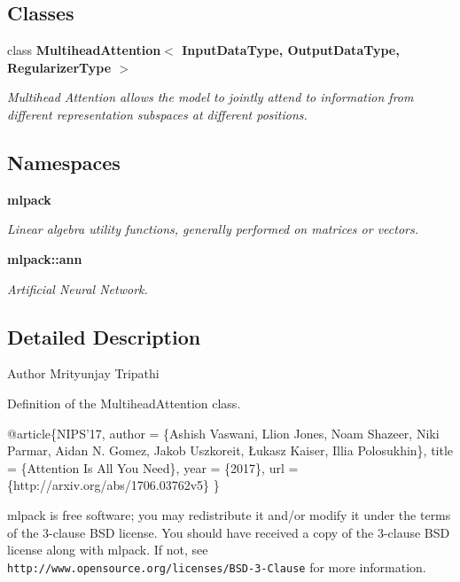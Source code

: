 \subsection*{Classes}
\begin{DoxyCompactItemize}
\item 
class \textbf{ Multihead\+Attention$<$ Input\+Data\+Type, Output\+Data\+Type, Regularizer\+Type $>$}
\begin{DoxyCompactList}\small\item\em Multihead Attention allows the model to jointly attend to information from different representation subspaces at different positions. \end{DoxyCompactList}\end{DoxyCompactItemize}
\subsection*{Namespaces}
\begin{DoxyCompactItemize}
\item 
 \textbf{ mlpack}
\begin{DoxyCompactList}\small\item\em Linear algebra utility functions, generally performed on matrices or vectors. \end{DoxyCompactList}\item 
 \textbf{ mlpack\+::ann}
\begin{DoxyCompactList}\small\item\em Artificial Neural Network. \end{DoxyCompactList}\end{DoxyCompactItemize}


\subsection{Detailed Description}
\begin{DoxyAuthor}{Author}
Mrityunjay Tripathi
\end{DoxyAuthor}
Definition of the Multihead\+Attention class.


\begin{DoxyCode}
@article\{NIPS\textcolor{stringliteral}{'17,}
\textcolor{stringliteral}{  author  = \{Ashish Vaswani, Llion Jones, Noam Shazeer, Niki Parmar,}
\textcolor{stringliteral}{             Aidan N. Gomez, Jakob Uszkoreit, Łukasz Kaiser,}
\textcolor{stringliteral}{             Illia Polosukhin\},}
\textcolor{stringliteral}{  title   = \{Attention Is All You Need\},}
\textcolor{stringliteral}{  year    = \{2017\},}
\textcolor{stringliteral}{  url     = \{http://arxiv.org/abs/1706.03762v5\}}
\textcolor{stringliteral}{\}}
\end{DoxyCode}


mlpack is free software; you may redistribute it and/or modify it under the terms of the 3-\/clause B\+SD license. You should have received a copy of the 3-\/clause B\+SD license along with mlpack. If not, see {\tt http\+://www.\+opensource.\+org/licenses/\+B\+S\+D-\/3-\/\+Clause} for more information. 